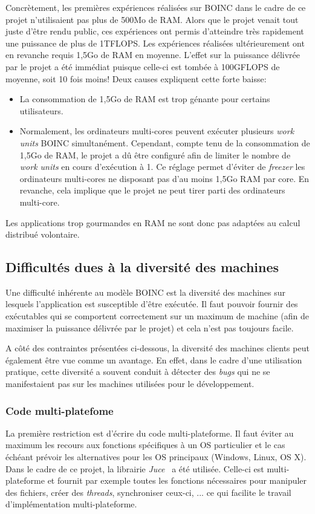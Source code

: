 \documentclass[a4paper, 12pt]{report}
\begin{document}
Concrètement, les premières expériences réalisées sur \textsc{BOINC} dans le cadre de ce projet n'utilisaient pas plus de 500Mo de RAM. Alors que le projet venait tout juste d'être rendu public, ces expériences ont permis d'atteindre très rapidement une puissance de plus de 1TFLOPS. Les expériences réalisées ultérieurement ont en revanche requis 1,5Go de RAM en moyenne. L'effet sur la puissance délivrée par le projet a été immédiat puisque celle-ci est tombée à 100GFLOPS de moyenne, soit 10 fois moins! Deux causes expliquent cette forte baisse:
\begin{itemize}
\item La consommation de 1,5Go de RAM est trop génante pour certains utilisateurs.
\item Normalement, les ordinateurs multi-cores peuvent exécuter plusieurs \textit{work units} \textsc{BOINC} simultanément. Cependant, compte tenu de la consommation de 1,5Go de RAM, le projet a dû être configuré afin de limiter le nombre de \textit{work units} en cours d'exécution à 1. Ce réglage permet d'éviter de \textit{freezer} les ordinateurs multi-cores ne disposant pas d'au moins 1,5Go RAM par core. En revanche, cela implique que le projet ne peut tirer parti des ordinateurs multi-core.
\end{itemize}

Les applications trop gourmandes en RAM ne sont donc pas adaptées au calcul distribué volontaire.

\subsection{Difficultés dues à la diversité des machines}
Une difficulté inhérente au modèle \textsc{BOINC} est la diversité des machines sur lesquels l'application est susceptible d'être exécutée. Il faut pouvoir fournir des exécutables qui se comportent correctement sur un maximum de machine (afin de maximiser la puissance délivrée par le projet) et cela n'est pas toujours facile.

A côté des contraintes présentées ci-dessous, la diversité des machines clients peut également être vue comme un avantage. En effet, dans le cadre d'une utilisation pratique, cette diversité a souvent conduit à détecter des \textit{bugs} qui ne se manifestaient pas sur les machines utilisées pour le développement.

\subsubsection{Code multi-platefome}
La première restriction est d'écrire du code multi-plateforme. Il faut éviter au maximum les recours aux fonctions spécifiques à un OS particulier et le cas échéant prévoir les alternatives pour les OS principaux (Windows, Linux, OS X). Dans le cadre de ce projet, la librairie \textit{Juce}~\cite{JUCE} a été utilisée. Celle-ci est multi-plateforme et fournit par exemple toutes les fonctions nécessaires pour manipuler des fichiers, créer des \textit{threads},  synchroniser ceux-ci, ... ce qui facilite le travail d'implémentation multi-plateforme. 
\end{document}
